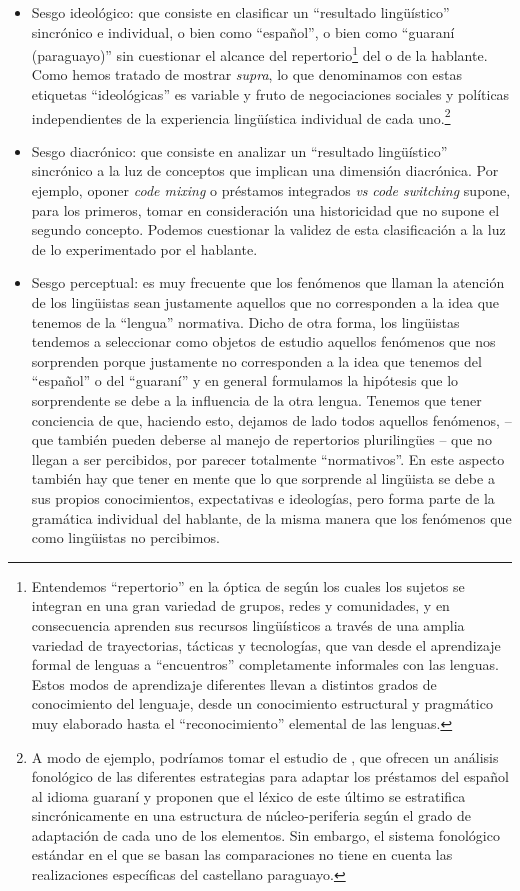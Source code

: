 \documentclass[output=paper]{langscibook}
\begin{document}
\begin{itemize}
\item
Sesgo ideológico: que consiste en clasificar un “resultado lingüístico” sincrónico e individual, o bien como “español”, o bien como “guaraní (paraguayo)” sin cuestionar el alcance del repertorio\footnote{Entendemos “repertorio” en la óptica de  \citet{BlommaertBackus2011} según los cuales los sujetos se integran en una gran variedad de grupos, redes y comunidades, y en consecuencia aprenden sus recursos lingüísticos a través de una amplia variedad de trayectorias, tácticas y tecnologías, que van desde el aprendizaje formal de lenguas a “encuentros” completamente informales con las lenguas. Estos modos de aprendizaje diferentes llevan a distintos grados de conocimiento del lenguaje, desde un conocimiento estructural y pragmático muy elaborado hasta el “reconocimiento” elemental de las lenguas.} del o de la hablante. Como hemos tratado de mostrar \textit{supra}, lo que denominamos con estas etiquetas “ideológicas” es variable y fruto de negociaciones sociales y políticas independientes de la experiencia lingüística individual de cada uno.\footnote{A modo de ejemplo, podríamos tomar el estudio de   \citet{PintaSmith2017}, que ofrecen un análisis fonológico de las diferentes estrategias para adaptar los préstamos del español al idioma guaraní y proponen que el léxico de este último se estratifica sincrónicamente en una estructura de núcleo-periferia según el grado de adaptación de cada uno de los elementos. Sin embargo, el sistema fonológico estándar en el que se basan las comparaciones no tiene en cuenta las realizaciones específicas del castellano paraguayo.}

\item
Sesgo diacrónico: que consiste en analizar un “resultado lingüístico” sincrónico a la luz de conceptos que implican una dimensión diacrónica. Por ejemplo, oponer \textit{code mixing} o préstamos integrados \textit{vs} \textit{code switching} supone, para los primeros, tomar en consideración una historicidad que no supone el segundo concepto. Podemos cuestionar la validez de esta clasificación a la luz de lo experimentado por el hablante.

\item
Sesgo perceptual: es muy frecuente que los fenómenos que llaman la atención de los lingüistas sean justamente aquellos que no corresponden a la idea que tenemos de la “lengua” normativa. Dicho de otra forma, los lingüistas tendemos a seleccionar como objetos de estudio aquellos fenómenos que nos sorprenden porque justamente no corresponden a la idea que tenemos del “español” o del “guaraní” y en general formulamos la hipótesis que lo sorprendente se debe a la influencia de la otra lengua. Tenemos que tener conciencia de que, haciendo esto, dejamos de lado todos aquellos fenómenos, -- que también pueden deberse al manejo de repertorios plurilingües\- -- que no llegan a ser percibidos, por parecer totalmente “normativos”. En este aspecto también hay que tener en mente que lo que sorprende al lingüista \-\-\-se debe a sus propios conocimientos, expectativas e ideologías, pero forma parte de la gramática individual del hablante, de la misma manera que los fenómenos que como lingüistas no percibimos.


\end{itemize}
\end{document}
